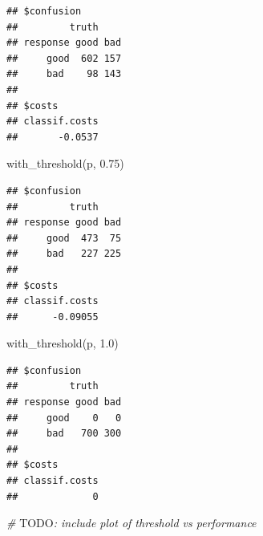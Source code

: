 \documentclass[
]{scrbook}
\newenvironment{Shaded}{\begin{snugshade}}{\end{snugshade}}
\newcommand{\AlertTok}[1]{\textcolor[rgb]{0.94,0.16,0.16}{#1}}
\newcommand{\AttributeTok}[1]{\textcolor[rgb]{0.77,0.63,0.00}{#1}}
\newcommand{\CommentTok}[1]{\textcolor[rgb]{0.56,0.35,0.01}{\textit{#1}}}
\newcommand{\ControlFlowTok}[1]{\textcolor[rgb]{0.13,0.29,0.53}{\textbf{#1}}}
\newcommand{\FloatTok}[1]{\textcolor[rgb]{0.00,0.00,0.81}{#1}}
\newcommand{\FunctionTok}[1]{\textcolor[rgb]{0.00,0.00,0.00}{#1}}
\newcommand{\NormalTok}[1]{#1}
\newcommand{\OtherTok}[1]{\textcolor[rgb]{0.56,0.35,0.01}{#1}}
\newcommand{\SpecialCharTok}[1]{\textcolor[rgb]{0.00,0.00,0.00}{#1}}
\renewenvironment{Shaded} {\begin{snugshade}\small} {\end{snugshade}}
\begin{document}
\begin{Shaded}
\end{Shaded}

\begin{verbatim}
## $confusion
##         truth
## response good bad
##     good  602 157
##     bad    98 143
## 
## $costs
## classif.costs 
##       -0.0537
\end{verbatim}

\begin{Shaded}
\begin{Highlighting}[]
\FunctionTok{with\_threshold}\NormalTok{(p, }\FloatTok{0.75}\NormalTok{)}
\end{Highlighting}
\end{Shaded}

\begin{verbatim}
## $confusion
##         truth
## response good bad
##     good  473  75
##     bad   227 225
## 
## $costs
## classif.costs 
##      -0.09055
\end{verbatim}

\begin{Shaded}
\begin{Highlighting}[]
\FunctionTok{with\_threshold}\NormalTok{(p, }\FloatTok{1.0}\NormalTok{)}
\end{Highlighting}
\end{Shaded}

\begin{verbatim}
## $confusion
##         truth
## response good bad
##     good    0   0
##     bad   700 300
## 
## $costs
## classif.costs 
##             0
\end{verbatim}

\begin{Shaded}
\begin{Highlighting}[]
\CommentTok{\# }\AlertTok{TODO}\CommentTok{: include plot of threshold vs performance}
\end{Highlighting}
\end{Shaded}
\end{document}
